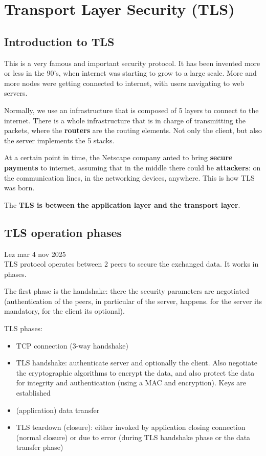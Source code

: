 \chapter[]{Transport Layer Security (TLS)}

\section{Introduction to TLS}
This is a very famous and important security protocol. It has been invented more or less in the 90's, when internet was starting to grow to a large scale. More and more nodes were getting connected to internet, with users navigating to web servers.

Normally, we use an infrastructure that is composed of 5 layers to connect to the internet. There is a whole infrastructure that is in charge of transmitting the packets, where the \textbf{routers} are the routing elements. Not only the client, but also the server implements the 5 stacks.

At a certain point in time, the Netscape company anted to bring \textbf{secure payments} to internet, assuming that in the middle there could be \textbf{attackers}: on the communication lines, in the networking devices, anywhere. This is how TLS was born.

The \textbf{TLS is between the application layer and the transport layer}.

\section{TLS operation phases}
Lez mar 4 nov 2025\\
TLS protocol operates between 2 peers to secure the exchanged data. It works in phases.

The first phase is the handshake: there the security parameters are negotiated (authentication of the peers, in particular of the server, happens. for the server its mandatory, for the client its optional).

TLS phases:
\begin{itemize}
    \item TCP connection (3-way handshake)
    \item TLS handshake: authenticate server and optionally the client. Also negotiate the cryptographic algorithms to encrypt the data, and also protect the data for integrity and authentication (using a MAC and encryption). Keys are established
    \item (application) data transfer
    \item TLS teardown (closure): either invoked by application closing connection (normal closure) or due to error (during TLS handshake phase or the data transfer phase)
\end{itemize}

